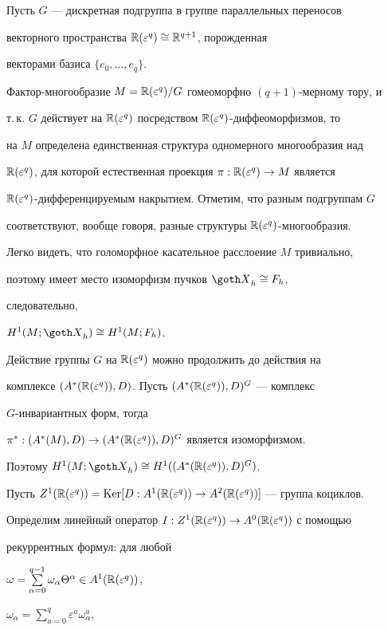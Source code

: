 \begin{exam}


Пусть $G$ --- дискретная подгруппа в группе параллельных переносов


векторного пространства $\Bbb R(\varepsilon^q) \cong {\Bbb R}^{q+1}$, порожденная


векторами базиса $\{e_0, \dotsc, e_q\}$.


Фактор-многообразие $M = \Bbb R(\varepsilon^q)/G$ гомеоморфно $(q+1)$-мерному тору, и


т.\,к. $G$ действует на $\Bbb R(\varepsilon^q)$ посредством $\Bbb R(\varepsilon^q)$-диффеоморфизмов, то


на $M$ определена единственная структура одномерного многообразия над


$\Bbb R(\varepsilon^q)$, для которой естественная проекция $\pi : \Bbb R(\varepsilon^q) \to M$ является


$\Bbb R(\varepsilon^q)$-дифференцируемым накрытием. Отметим, что разным подгруппам $G$


соответствуют, вообще говоря, разные структуры $\Bbb R(\varepsilon^q)$-многообразия.


Легко видеть, что голоморфное касательное расслоение $M$ тривиально,


поэтому имеет место изоморфизм пучков ${\goth X}_h \cong F_h$,


следовательно,


$H^1(M;{\goth X}_h) \cong H^1(M; F_h)$.





Действие группы $G$ на $\Bbb R(\varepsilon^q)$ можно продолжить до действия на


комплексе $(A^*(\Bbb R(\varepsilon^q)), D)$. Пусть $(A^*(\Bbb R(\varepsilon^q)), D)^G$ --- комплекс


$G$-инвариантных форм, тогда


$\pi^* : (A^*(M), D) \to (A^*(\Bbb R(\varepsilon^q)), D)^G$ является изоморфизмом.


Поэтому $H^1(M;{\goth X}_h) \cong H^1((A^*(\re), D)^G)$.





Пусть $Z^1(\Bbb R(\varepsilon^q)) = \operatorname{Ker}[D: A^1(\Bbb R(\varepsilon^q)) \to A^2(\Bbb R(\varepsilon^q))]$ --- группа коциклов.


Определим линейный оператор $I : Z^1(\Bbb R(\varepsilon^q)) \to A^0(\Bbb R(\varepsilon^q))$ с помощью


рекуррентных формул:  для любой


$\omega = \sum\limits_{\alpha = 0}^{q-1}


\omega_\alpha \Theta^\alpha \in A^1(\re)$,


$\omega_\alpha = \sum\limits_{a=0}^q\varepsilon^a\omega^a_\alpha$,



\end{exam}
